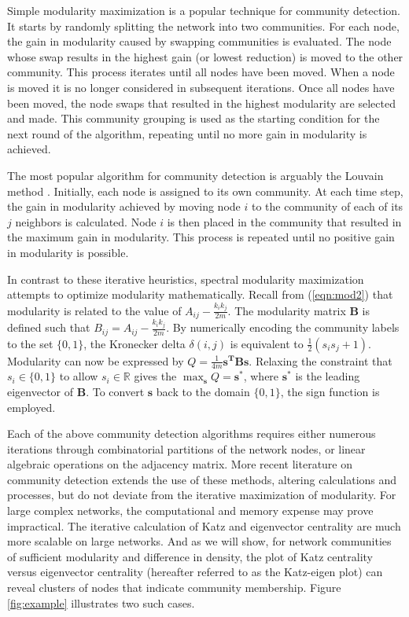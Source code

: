 \documentclass{IEEEtran}
\begin{document}
	Simple modularity maximization is a popular technique for community detection\cite{simpleMM2}. It starts by randomly splitting the network into two communities. For each node, the gain in modularity caused by swapping communities is evaluated. The node whose swap results in the highest gain (or lowest reduction) is moved to the other community. This process iterates until all nodes have been moved. When a node is moved it is no longer considered in subsequent iterations. Once all nodes have been moved, the node swaps that resulted in the highest modularity are selected and made. This community grouping is used as the starting condition for the next round of the algorithm, repeating until no more gain in modularity is achieved.
	
	The most popular algorithm for community detection is arguably the Louvain method \cite{louvain}. Initially, each node is assigned to its own community. At each time step, the gain in modularity achieved by moving node $i$ to the community of each of its $j$ neighbors is calculated. Node $i$ is then placed in the community that resulted in the maximum gain in modularity. This process is repeated until no positive gain in modularity is possible.
	
	In contrast to these iterative heuristics, spectral modularity maximization attempts to optimize modularity mathematically\cite{spectral}. Recall from (\ref{eqn:mod2}) that modularity is related to the value of $A_{ij} - \frac{k_ik_j}{2m}$. The modularity matrix $\mathbf{B}$ is defined such that $B_{ij} =A_{ij} - \frac{k_ik_j}{2m}$. By numerically encoding the community labels to the set $\{0,1\}$, the Kronecker delta $\delta(i,j)$ is equivalent to $\frac{1}{2}(s_is_j + 1)$. Modularity can now be expressed by $Q = \frac{1}{4m}\mathbf{s^T}\mathbf{B}\mathbf{s}$. Relaxing the constraint that $s_i\in\{0,1\}$ to allow $s_i\in \mathbb{R}$ gives the $\max_{\mathbf{s}}Q = \mathbf{s^*}$, where $\mathbf{s^*}$ is the leading eigenvector of $\mathbf{B}$. To convert $\mathbf{s}$ back to the domain $\{0,1\}$, the sign function is employed.
	
	Each of the above community detection algorithms requires either numerous iterations through combinatorial partitions of the network nodes, or linear algebraic operations on the adjacency matrix. More recent literature on community detection extends the use of these methods, altering calculations and processes, but do not deviate from the iterative maximization of modularity\cite{Leider,alpha}. For large complex networks, the computational and memory expense may prove impractical. The iterative calculation of Katz and eigenvector centrality are much more scalable on large networks. And as we will show, for network communities of sufficient modularity and difference in density, the plot of Katz centrality versus eigenvector centrality (hereafter referred to as the Katz-eigen plot) can reveal clusters of nodes that indicate community membership. Figure \ref{fig:example} illustrates two such cases.
	
\end{document}
